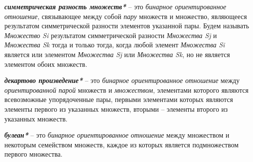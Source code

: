\textbf{\textit{симметрическая разность множеств*}} – это \textit{бинарное ориентированное отношение}, связывающее между собой \textit{пару} множеств и множество, являющееся результатом симметрической разности элементов указанной пары. Будем называть \textit{Множество Si} результатом симметрической разности \textit{Множества Sj} и \textit{Множества Sk} тогда и только тогда, когда любой элемент \textit{Множества Si} является или элементом \textit{Множества Sj} или \textit{Множества Sk}, но не является элементом обоих множеств.

\begin{SCn}
\end{SCn}

\textbf{\textit{декартово произведение*}} – это \textit{бинарное ориентированное отношение} между \textit{ориентированной парой} множеств и \textit{множеством}, элементами которого являются всевозможные упорядоченные пары, первыми элементами которых являются элементы первого из указанных множеств, вторыми – элементы второго из указанных множеств.

\begin{SCn}
\end{SCn}
	
\textbf{\textit{булеан*}} – это \textit{бинарное ориентированное отношение} между множеством и некоторым семейством множеств, каждое из которых является подмножеством первого множества.

\begin{SCn}
\end{SCn}

